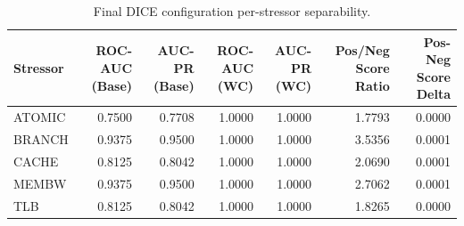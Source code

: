 \begin{table}[t]
\centering
\caption{Final DICE configuration per-stressor separability.}
\label{tab:dice_full_stressor}
\footnotesize
\begin{tabular}{lrrrrrr}
\toprule
Stressor & ROC-AUC (Base) & AUC-PR (Base) & ROC-AUC (WC) & AUC-PR (WC) & Pos/Neg Score Ratio & Pos-Neg Score Delta \\
\midrule
ATOMIC & 0.7500 & 0.7708 & 1.0000 & 1.0000 & 1.7793 & 0.0000 \\
BRANCH & 0.9375 & 0.9500 & 1.0000 & 1.0000 & 3.5356 & 0.0001 \\
CACHE & 0.8125 & 0.8042 & 1.0000 & 1.0000 & 2.0690 & 0.0001 \\
MEMBW & 0.9375 & 0.9500 & 1.0000 & 1.0000 & 2.7062 & 0.0001 \\
TLB & 0.8125 & 0.8042 & 1.0000 & 1.0000 & 1.8265 & 0.0000 \\
\bottomrule
\end{tabular}

\end{table}
